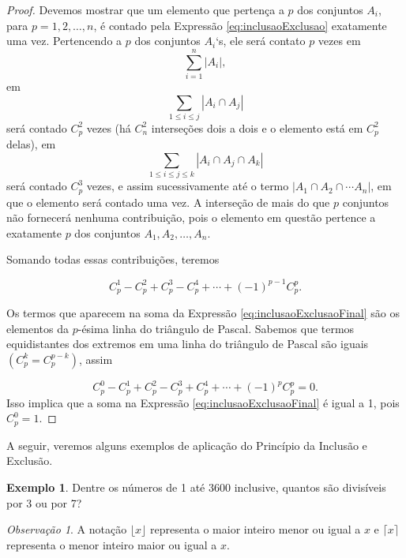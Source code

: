 \documentclass[]{book}
\theoremstyle{definition}
\theoremstyle{definition}
\newtheorem{example}{Exemplo}[chapter]
\theoremstyle{definition}
\theoremstyle{remark}
\newtheorem*{remark}{Observação}
\begin{document}
\begin{proof}
\iffalse{} {Prova. } \fi{}Devemos mostrar que um elemento que pertença a \(p\) dos conjuntos \(A_i\), para \(p=1,2,\ldots, n\), é contado pela Expressão \eqref{eq:inclusaoExclusao} exatamente uma vez.
Pertencendo a \(p\) dos conjuntos \(A_i\)`s, ele será contato \(p\) vezes em
\[\sum_{i=1}^{n} |A_i|,\]
em
\[\sum_{1\leq i\leq j} |A_i \cap A_j|\]
será contado \(C^2_p\) vezes (há \(C^2_n\) interseções dois a dois e o elemento está em \(C^2_p\) delas),
em
\[\sum_{1\leq i\leq j\leq k} |A_i \cap A_j \cap A_k|\]
será contado \(C^3_p\) vezes, e assim sucessivamente até o termo \(|A_1 \cap A_2 \cap \cdots A_n|\), em que o elemento será contado uma vez.
A interseção de mais do que \(p\) conjuntos não fornecerá nenhuma contribuição, pois o elemento em questão pertence a exatamente \(p\) dos conjuntos \(A_1, A_2, \ldots, A_n\).

Somando todas essas contribuições, teremos

\begin{equation}
C^{1}_{p}-C^{2}_{p}+C^{3}_{p}-C^{4}_{p}+\cdots +(-1)^{p-1}C^{p}_{p}.
\label{eq:inclusaoExclusaoFinal}
\end{equation}

Os termos que aparecem na soma da Expressão \eqref{eq:inclusaoExclusaoFinal} são os elementos da \(p\)-ésima linha do triângulo de Pascal.
Sabemos que termos equidistantes dos extremos em uma linha do triângulo de Pascal são iguais \((C^{k}_{p}=C^{p-k}_{p})\), assim

\[C^{0}_{p}-C^{1}_{p}+C^{2}_{p}-C^{3}_{p}+C^{4}_{p}+\cdots +(-1)^{p}C^{p}_{p} = 0.\]
Isso implica que a soma na Expressão \eqref{eq:inclusaoExclusaoFinal} é igual a 1, pois \(C^{0}_{p}=1\).
\end{proof}

A seguir, veremos alguns exemplos de aplicação do Princípio da Inclusão e Exclusão.

\begin{example}
\protect\hypertarget{exm:unnamed-chunk-94}{}{\label{exm:unnamed-chunk-94} }Dentre os números de 1 até 3600 inclusive, quantos são divisíveis por 3 ou por 7?
\end{example}

\begin{remark}
\iffalse{} {Observação. } \fi{}A notação \(\big\lfloor{x}\big\rfloor\) representa o maior inteiro menor ou igual a \(x\) e \(\big\lceil{x}\big\rceil\) representa o menor inteiro maior ou igual a \(x\).
\end{remark}
\end{document}

